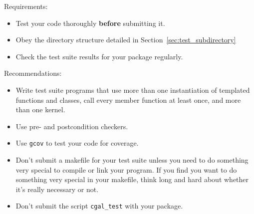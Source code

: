 \noindent
Requirements:
\begin{itemize}
   \item Test your code thoroughly \textbf{before} submitting it.
   \item Obey the directory structure detailed in Section~\ref{sec:test_subdirectory}
   \item Check the test suite results for your package regularly. 
\end{itemize}

\noindent
Recommendations:
\begin{itemize}
   \item Write test suite programs that use more than one instantiation of
         templated functions and classes, call every member function at least
         once, and more than one kernel. 
   \item Use pre- and postcondition checkers.
   \item Use \texttt{gcov} to test your code for coverage.
   \item Don't submit a makefile for your test suite unless you need to do
         something very special to compile or link your program.  If you find
         you want to do something very special in your makefile, think long
         and hard about whether it's really necessary or not.
   \item Don't submit the script \texttt{cgal\_test} with your package.
\end{itemize}




